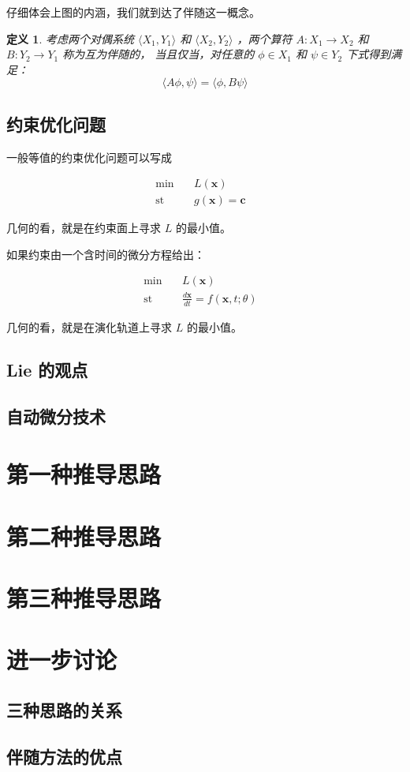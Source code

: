 \documentclass[a4paper,12pt]{article}
\newtheorem{definition}{定义}
\begin{document}
仔细体会上图的内涵，我们就到达了伴随这一概念。

\begin{definition}
\label{d1}
考虑两个对偶系统 $ \langle X_1, Y_1 \rangle $ 和 $ \langle X_2, Y_2 \rangle $ ，两个算符 $ A : X_1 \to X_2$ 和  $B : Y_2 \to Y_1 $ 称为互为伴随的，
当且仅当，对任意的 $ \phi \in X_1 $ 和 $ \psi \in Y_2 $ 下式得到满足：$$ \langle A \phi, \psi \rangle = \langle \phi, B \psi \rangle $$
\end{definition}

\subsection{约束优化问题}

一般等值的约束优化问题可以写成

$$
\begin{array}{rcll}
\min &~& L(\mathbf{x}) & \\
\mathrm{st} &~& g(\mathbf{x}) = \mathbf{c}
\end{array}
$$

几何的看，就是在约束面上寻求 $ L $ 的最小值。

如果约束由一个含时间的微分方程给出：

$$
\begin{array}{rcll}
\min &~& L(\mathbf{x}) & \\
\mathrm{st} &~& \frac{d\mathbf{x}}{dt} = f(\mathbf{x}, t; \theta)
\end{array}
$$

几何的看，就是在演化轨道上寻求 $ L $ 的最小值。

\subsection{Lie 的观点}

\subsection{自动微分技术}

\section{第一种推导思路}

\section{第二种推导思路}

\section{第三种推导思路}

\section{进一步讨论}

\subsection{三种思路的关系}

\subsection{伴随方法的优点}
\end{document}
